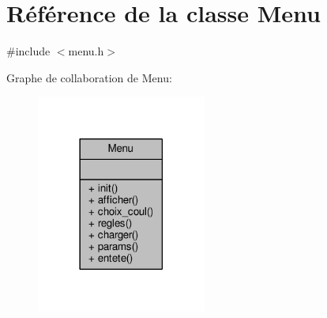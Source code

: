 \hypertarget{classMenu}{}\section{Référence de la classe Menu}
\label{classMenu}


{\ttfamily \#include $<$menu.\+h$>$}



Graphe de collaboration de Menu\+:\nopagebreak
\begin{figure}[H]
\begin{center}
\leavevmode
\includegraphics[width=158pt]{classMenu__coll__graph}
\end{center}
\end{figure}
